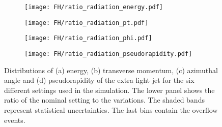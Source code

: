 \begin{figure}[H]
    \centering
    \begin{subfigure}{0.49\textwidth}
        \centering
        \texttt{[image: FH/ratio\_radiation\_energy.pdf]}
        \caption{}
        \label{app:subfig:E(radiation)_FH}
    \end{subfigure}
    \begin{subfigure}{0.49\textwidth}
        \centering
        \texttt{[image: FH/ratio\_radiation\_pt.pdf]}
        \caption{}
        \label{app:subfig:pt(radiation)_FH}
    \end{subfigure}

    \vspace{0.2cm}
    
    \begin{subfigure}{0.49\textwidth}
        \centering
        \texttt{[image: FH/ratio\_radiation\_phi.pdf]}
        \caption{}
        \label{app:subfig:phi(radiation)_FH}
    \end{subfigure}
    \begin{subfigure}{0.49\textwidth}
        \centering
        \texttt{[image: FH/ratio\_radiation\_pseudorapidity.pdf]}
        \caption{}
        \label{app:subfig:eta(radiation)_FH}
    \end{subfigure}
    \caption{Distributions of (a) energy, (b) transverse momentum,  (c) azimuthal angle and (d) pseudorapidity of the extra light jet for the six different settings used in the simulation. The lower panel shows the ratio of the nominal setting to the variations. The shaded bands represent statistical uncertainties. The last bins contain the overflow events.}
    \label{app:fig:radiation_FH}
\end{figure}
